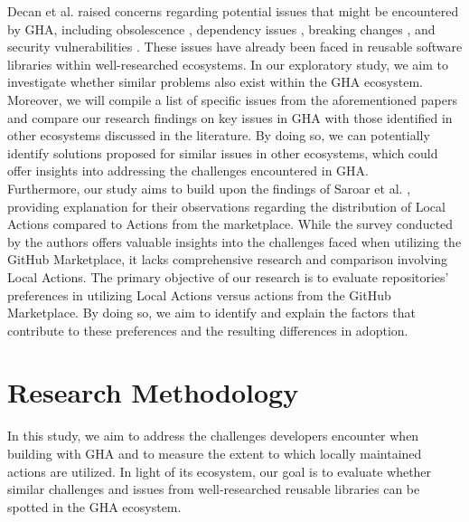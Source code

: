 \documentclass[conference]{IEEEtran}
\begin{document}
	Decan et al. \cite{decan2022use} raised concerns regarding potential issues that might be encountered by GHA, including obsolescence \cite{decan2018evolution} \cite{cogo2021deprecation}, dependency issues \cite{decan2019empirical} \cite{soto2021comprehensive} \cite{decan2019package}, breaking changes \cite{dietrich2019dependency} \cite{decan2018impact}, and security vulnerabilities \cite{zimmermann2019small} \cite{kula2018developers}. These issues have already been faced in reusable software libraries within well-researched ecosystems. In our exploratory study, we aim to investigate whether similar problems also exist within the GHA ecosystem. Moreover, we will compile a list of specific issues from the aforementioned papers and compare our research findings on key issues in GHA with those identified in other ecosystems discussed in the literature. By doing so, we can potentially identify solutions proposed for similar issues in other ecosystems, which could offer insights into addressing the challenges encountered in GHA.\\
	Furthermore, our study aims to build upon the findings of Saroar et al. \cite{saroar2023developers}, providing explanation for their observations regarding the distribution of Local Actions compared to Actions from the marketplace. While the survey conducted by the authors offers valuable insights into the challenges faced when utilizing the GitHub Marketplace, it lacks comprehensive research and comparison involving Local Actions. The primary objective of our research is to evaluate repositories' preferences in utilizing Local Actions versus actions from the GitHub Marketplace. By doing so, we aim to identify and explain the factors that contribute to these preferences and the resulting differences in adoption.




\section{Research Methodology}
    In this study, we aim to address the challenges developers encounter when building with GHA and to measure the extent to which locally maintained actions are utilized. In light of its ecosystem, our goal is to evaluate whether similar challenges and issues from well-researched reusable libraries can be spotted in the GHA ecosystem.\\
\end{document}

